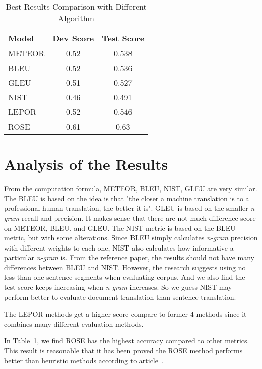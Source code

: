 \documentclass[11pt]{article}
\begin{document}
\begin{table}
\begin{center}
\begin{tabular}{|l|c|c|}
\hline
\textbf{Model} & \textbf{Dev Score} & \textbf{Test Score} \\
\hline
METEOR         & 0.52             & 0.538               \\
BLEU           & 0.52               & 0.536               \\
GLEU           & 0.51               & 0.527               \\
NIST           & 0.46               & 0.491                \\
LEPOR          & 0.52              & 0.546               \\
ROSE           & 0.61         & 0.63                    \\
\hline
\end{tabular}
\end{center}
\caption{\label{tab:all} Best Results Comparison with Different Algorithm  }
\end{table}


\section{Analysis of the Results}
From the computation formula, METEOR, BLEU, NIST, GLEU are very similar. The BLEU is based on the idea is that "the closer a machine translation is to a professional human translation, the better it is". GLEU is based on the smaller \emph{n-gram} recall and precision. It makes sense that there are not much difference score on METEOR, BLEU, and GLEU. The NIST metric is based on the BLEU metric, but with some alterations. Since BLEU simply calculates \emph{n-gram} precision with different weights to each one, NIST also calculates how informative a particular \emph{n-gram} is. From the reference paper, the results should not have many differences between BLEU and NIST. However, the research suggests using no less than one sentence segments when evaluating corpus. And we also find the test score keeps increasing when \emph{n-gram} increases. So we guess NIST may perform better to evaluate document translation than sentence translation.


The LEPOR methods get a higher score compare to former 4 methods since it combines many different evaluation methods.


In Table~\ref{tab:all}, we find ROSE has the highest accuracy compared to other metrics. This result is reasonable that it has been proved the ROSE method performs better than heuristic methods according to article~\cite{WMT:11}. 
\end{document}
